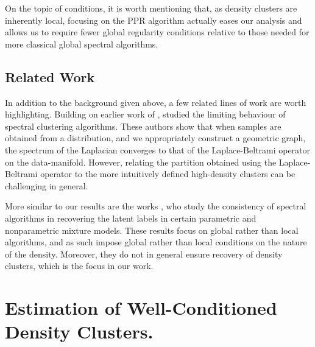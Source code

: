 \documentclass{article}
\newcommand{\1}{\mathbf{1}}
\theoremstyle{aldenthm}
\theoremstyle{aldenrmrk}
\begin{document}
On the topic of conditions, it is worth mentioning that, as density clusters
are inherently local, focusing on the PPR algorithm actually eases our analysis
and allows us to require fewer global regularity conditions relative to those
needed for more classical global spectral algorithms.    

\subsection{Related Work}

In addition to the background given above, a few related lines of work are worth
highlighting. Building on earlier work of
\citep{koltchinskii2000}, \citep{vonluxburg2008,hein2005} studied the limiting behaviour of spectral clustering
algorithms. These authors show that when samples are obtained from a
distribution, and we appropriately construct a geometric graph, the spectrum of
the Laplacian converges to that of the Laplace-Beltrami operator on the
data-manifold. However, relating the partition obtained using the
Laplace-Beltrami operator to the more intuitively defined high-density
clusters can be challenging in general.



More similar to our results are the works
\citep{vempala2004,shi2009,schiebinger2015}, who study the consistency of
spectral algorithms in recovering the latent labels in certain parametric and
nonparametric mixture models. These results focus on global rather than local
algorithms, and as such impose global rather than local conditions on the nature
of the density. Moreover, they do not in general ensure recovery of density
clusters, which is the focus in our work. 

\section{Estimation of Well-Conditioned Density Clusters.}
\label{sec: consistent_cluster_estimation_with_ppr}
\end{document}
